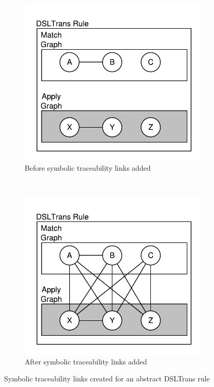 \begin{figure}[htb]
        \centering
        \begin{subfigure}[b]{0.24\textwidth}
                \centering
                \includegraphics[width=1\textwidth]{./figures/building_path_conditions/traceability_links.pdf}
                \caption{Before symbolic traceability links added}
                \label{fig:traceability_links1}
        \end{subfigure}%
        ~~
        \begin{subfigure}[b]{0.235\textwidth}
                \centering
                \includegraphics[width=1\textwidth]{./figures/building_path_conditions/traceability_links2.pdf}
                \caption{After symbolic traceability links added}
                \label{fig:traceability_links2}
        \end{subfigure}%
        \caption{Symbolic traceability links created for an abstract DSLTrans rule}
        \label{fig:trace_links}
\end{figure}


